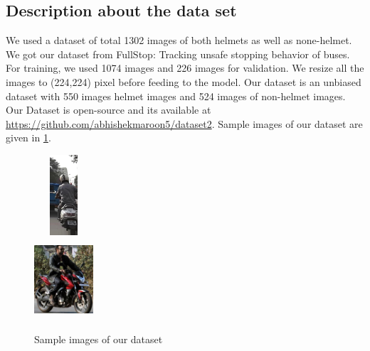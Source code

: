 \subsection{Description about the data set}
We used a dataset of total 1302 images of both helmets as well as none-helmet. We got our dataset from FullStop: Tracking unsafe stopping behavior of buses\cite{b12}. For training, we used 1074 images and 226 images for validation. We resize all the images to (224,224) pixel before feeding to the model. Our dataset is an unbiased dataset with 550 images helmet images and 524 images of non-helmet images. Our Dataset is open-source and its available at  \href{https://github.com/abhishekmaroon5/dataset2}{https://github.com/abhishekmaroon5/dataset2}. Sample images of our dataset are given in \ref{figure4}.
\begin{figure}[!htb]
\centerline{\includegraphics[height=30mm,width=22mm]{img/0_0_5402.jpg}{\\}{\includegraphics[height=30mm,width=22mm]{img/5577.jpg}}}

\caption{Sample images of our dataset}
\label{figure4}
\end{figure}
     
	

